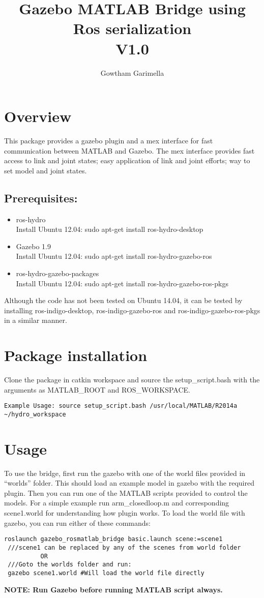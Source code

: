 \documentclass[letterpaper,10pt]{article}
\title{Gazebo MATLAB Bridge using Ros serialization \\V1.0} \label{gazebo-matlab-bridge-using-ros-serialization}
\author{Gowtham Garimella}
\begin{document}
\maketitle

\section{Overview}
This package provides a gazebo plugin and a mex interface for fast
communication between MATLAB and Gazebo. The mex interface provides fast
access to link and joint states; easy application of link and joint
efforts; way to set model and joint states. 
\subsection{Prerequisites:}
\begin{itemize}
 \item  ros-hydro \\ Install Ubuntu 12.04: sudo apt-get install ros-hydro-desktop
 \item Gazebo 1.9  \\ Install Ubuntu 12.04: sudo apt-get install ros-hydro-gazebo-ros
 \item ros-hydro-gazebo-packages \\ Install Ubuntu 12.04: sudo apt-get install ros-hydro-gazebo-ros-pkgs
\end{itemize}
Although the code has not been tested on Ubuntu 14.04, it can be tested by installing ros-indigo-desktop, ros-indigo-gazebo-ros and ros-indigo-gazebo-ros-pkgs in a similar manner.

\section{Package installation}
Clone the package in catkin workspace and source the
setup\_script.bash with the arguments as MATLAB\_ROOT and
ROS\_WORKSPACE.
\begin{Verbatim}[frame=single]
Example Usage: source setup_script.bash /usr/local/MATLAB/R2014a ~/hydro_workspace
\end{Verbatim}
\section{Usage} 
To use the bridge, first run the gazebo with one of the world files provided in ``worlds''
folder. This should load an example model in gazebo with the required
plugin. Then you can run one of the MATLAB scripts provided to control
the models. For a simple example run arm\_closedloop.m and corresponding scene1.world for understanding how plugin works. To load the
world file with gazebo, you can run either of these commands: 
\begin{Verbatim}[frame=single]
 roslaunch gazebo_rosmatlab_bridge basic.launch scene:=scene1 
 ///scene1 can be replaced by any of the scenes from world folder
		  OR
 ///Goto the worlds folder and run:
 gazebo scene1.world #Will load the world file directly
\end{Verbatim}
\textbf{NOTE: Run Gazebo before running MATLAB script always.}
\end{document}
